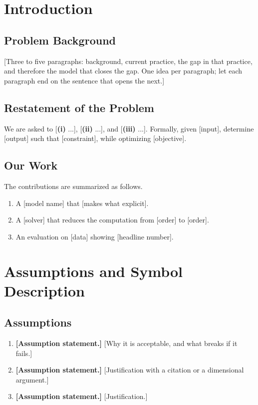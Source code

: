 \documentclass{swmcmthesis}
\title{\ph{Model Title: A Concise, Claim-Shaped Name}}  %
\date{2026}                  %
\begin{document}
\maketitle          %
\tableofcontents    %

\newpage
\setcounter{page}{1}

\section{Introduction}

\subsection{Problem Background}
[Three to five paragraphs: background, current practice, the gap in that
practice, and therefore the model that closes the gap. One idea per paragraph;
let each paragraph end on the sentence that opens the next.]

\subsection{Restatement of the Problem}
We are asked to [\textbf{(i)} ...], [\textbf{(ii)} ...], and
[\textbf{(iii)} ...]. Formally, given [input], determine [output] such that
[constraint], while optimizing [objective].

\subsection{Our Work}
The contributions are summarized as follows.
\begin{enumerate}
  \item A [model name] that [makes what explicit].
  \item A [solver] that reduces the computation from [order] to [order].
  \item An evaluation on [data] showing [headline number].
\end{enumerate}

\section{Assumptions and Symbol Description}

\subsection{Assumptions}
\begin{enumerate}
  \item \textbf{[Assumption statement.]} [Why it is acceptable, and what breaks
        if it fails.]
  \item \textbf{[Assumption statement.]} [Justification with a citation or a
        dimensional argument.]
  \item \textbf{[Assumption statement.]} [Justification.]
\end{enumerate}
\end{document}
